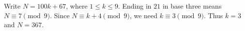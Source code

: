 Write $N=100k+67$, where $1\le k\le9$. Ending in $21$ in base three means $N\equiv7\pmod9$. Since $N\equiv k+4\pmod9$, we need $k\equiv3\pmod9$. Thus $k=3$ and $\boxed{N=367}$.
